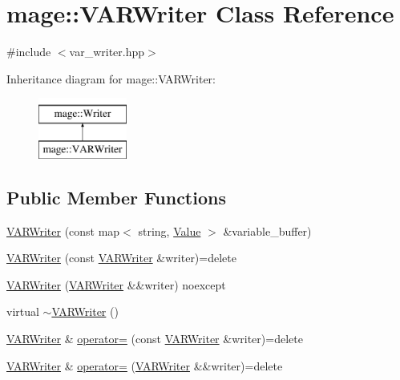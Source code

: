 \hypertarget{classmage_1_1_v_a_r_writer}{}\section{mage\+:\+:V\+A\+R\+Writer Class Reference}
\label{classmage_1_1_v_a_r_writer}


{\ttfamily \#include $<$var\+\_\+writer.\+hpp$>$}

Inheritance diagram for mage\+:\+:V\+A\+R\+Writer\+:\begin{figure}[H]
\begin{center}
\leavevmode
\includegraphics[height=2.000000cm]{classmage_1_1_v_a_r_writer}
\end{center}
\end{figure}
\subsection*{Public Member Functions}
\begin{DoxyCompactItemize}
\item 
\hyperlink{classmage_1_1_v_a_r_writer_a30f4311d6619f27984913445edb11cd0}{V\+A\+R\+Writer} (const map$<$ string, \hyperlink{namespacemage_aa1fe0628487e0706e44efdc62dbdb3a2}{Value} $>$ \&variable\+\_\+buffer)
\item 
\hyperlink{classmage_1_1_v_a_r_writer_aa5534d333e4c5d65cb52a7b0691c65ab}{V\+A\+R\+Writer} (const \hyperlink{classmage_1_1_v_a_r_writer}{V\+A\+R\+Writer} \&writer)=delete
\item 
\hyperlink{classmage_1_1_v_a_r_writer_a8b1cdab3305bb9ded3f54c1a0a5afafc}{V\+A\+R\+Writer} (\hyperlink{classmage_1_1_v_a_r_writer}{V\+A\+R\+Writer} \&\&writer) noexcept
\item 
virtual \hyperlink{classmage_1_1_v_a_r_writer_ad59bc50f1a5fdb04f59784c5b0b0d676}{$\sim$\+V\+A\+R\+Writer} ()
\item 
\hyperlink{classmage_1_1_v_a_r_writer}{V\+A\+R\+Writer} \& \hyperlink{classmage_1_1_v_a_r_writer_aeb83b34d9768ca823a138abe3f9dea28}{operator=} (const \hyperlink{classmage_1_1_v_a_r_writer}{V\+A\+R\+Writer} \&writer)=delete
\item 
\hyperlink{classmage_1_1_v_a_r_writer}{V\+A\+R\+Writer} \& \hyperlink{classmage_1_1_v_a_r_writer_ad94891c5ead079afd9c2d33dcb3010e1}{operator=} (\hyperlink{classmage_1_1_v_a_r_writer}{V\+A\+R\+Writer} \&\&writer)=delete
\end{DoxyCompactItemize}

